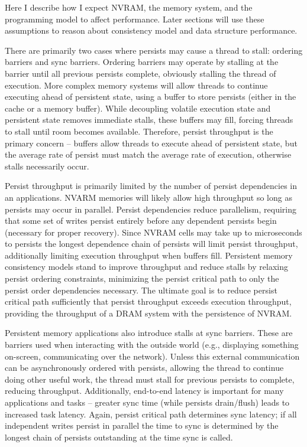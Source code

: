 Here I describe how I expect NVRAM, the memory system, and the programming model to affect performance.
Later sections will use these assumptions to reason about consistency model and data structure performance.

There are primarily two cases where persists may cause a thread to stall: ordering barriers and sync barriers.
Ordering barriers may operate by stalling at the barrier until all previous persists complete, obviously stalling the thread of execution.
More complex memory systems will allow threads to continue executing ahead of persistent state, using a buffer to store persists (either in the cache or a memory buffer).
While decoupling volatile execution state and persistent state removes immediate stalls, these buffers may fill, forcing threads to stall until room becomes available.
Therefore, persist throughput is the primary concern -- buffers allow threads to execute ahead of persistent state, but the average rate of persist must match the average rate of execution, otherwise stalls necessarily occur.

Persist throughput is primarily limited by the number of persist dependencies in an applications.
NVARM memories will likely allow high throughput so long as persists may occur in parallel.
Persist dependencies reduce parallelism, requiring that some set of writes persist entirely before any dependent persists begin (necessary for proper recovery).
Since NVRAM cells may take up to microseconds to persists the longest dependence chain of persists will limit persist throughput, additionally limiting execution throughput when buffers fill.
Persistent memory consistency models stand to improve throughput and reduce stalls by relaxing persist ordering constraints, minimizing the persist critical path to only the persist order dependencies necessary.
The ultimate goal is to reduce persist critical path sufficiently that persist throughput exceeds execution throughput, providing the throughput of a DRAM system with the persistence of NVRAM.

Persistent memory applications also introduce stalls at sync barriers.
These are barriers used when interacting with the outside world (e.g., displaying something on-screen, communicating over the network).
Unless this external communication can be asynchronously ordered with persists, allowing the thread to continue doing other useful work, the thread must stall for previous persists to complete, reducing throughput.
Additionally, end-to-end latency is important for many applications and tasks -- greater sync time (while persists drain/flush) leads to increased task latency.
Again, persist critical path determines sync latency; if all independent writes persist in parallel the time to sync is determined by the longest chain of persists outstanding at the time sync is called.

